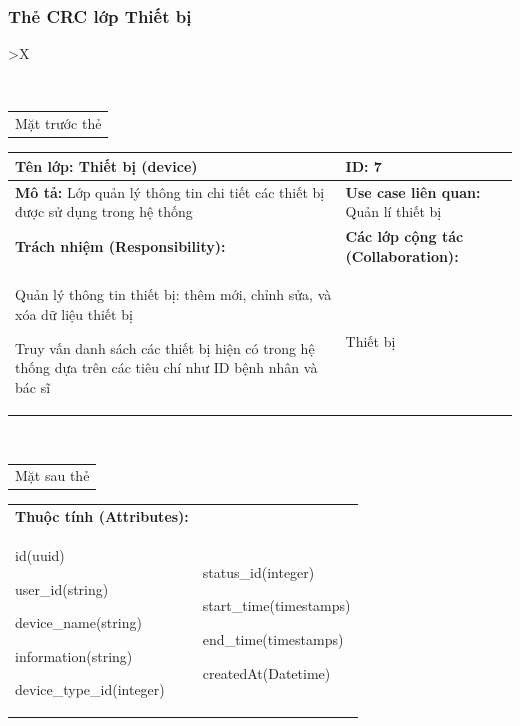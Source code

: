 \subsubsection{Thẻ CRC lớp Thiết bị}

\begin{xltabular}{\textwidth}{
		>{\centering\arraybackslash}X
	}
	\caption{\bfseries \fontsize{12pt}{0pt}\selectfont Thẻ CRC lớp Thiết bị}
	\\
	\begin{tabularx}{0.9\textwidth}{X}
		Mặt trước thẻ
	\end{tabularx}
	\begin{tabularx}{0.9\textwidth}{|X|X|}
		\hline
		\textbf{Tên lớp:} Thiết bị (device)                                                     & \textbf{ID:} 7                                 \\
		\hline
		\textbf{Mô tả:} Lớp quản lý thông tin chi tiết các thiết bị được sử dụng trong hệ thống & \textbf{Use case liên quan:}  Quản lí thiết bị \\
		\hline
		\textbf{Trách nhiệm (Responsibility):}                                                  & \textbf{Các lớp cộng tác (Collaboration):}     \\
		Quản lý thông tin thiết bị: thêm mới, chỉnh sửa, và xóa dữ liệu thiết bị

		Truy vấn danh sách các thiết bị hiện có trong hệ thống dựa trên các tiêu chí như ID bệnh nhân và bác sĩ
		                                                                                        &
		Thiết bị
		\\
		\hline
	\end{tabularx}
	\\
	\begin{tabularx}{0.9\textwidth}{X}
		Mặt sau thẻ
	\end{tabularx}
	\begin{tabularx}{0.9\textwidth}{|X|X|}
		\hline
		\textbf{Thuộc tính (Attributes):} & \\
		id(uuid)

		user\_id(string)

		device\_name(string)

		information(string)

		device\_type\_id(integer)
		                                  &
		status\_id(integer)

		start\_time(timestamps)

		end\_time(timestamps)

		createdAt(Datetime)


\end{tabularx}
\end{xltabular}
